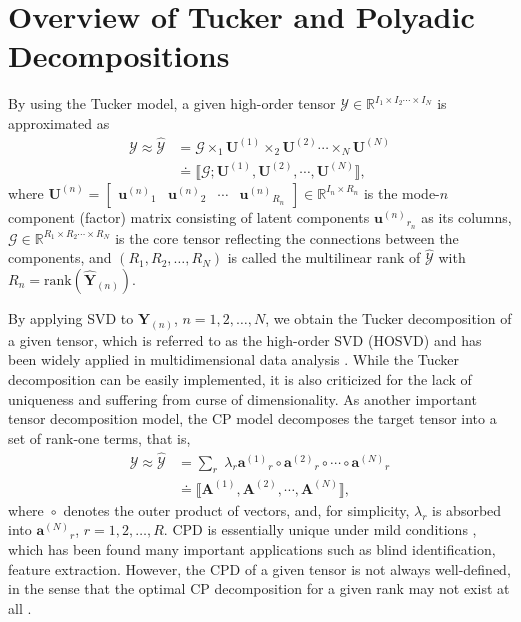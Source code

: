 \documentclass[10pt,twocolumn,twoside]{IEEEtran}
\newcommand{\tensor}[1]{\ensuremath{\boldsymbol{\mathscr{#1}}}}
\newcommand{\tenmat}[2][n]{\ensuremath{{\mathbf{#2}}_{(#1)}}}
\newcommand{\matn}[2][n]{\ensuremath{\mathbf{#2}^{(#1)}}}
\newcommand{\compactTucker}[2]{\ensuremath{\llbracket \tensor{#1}; {\mathbf{#2}}^{(1)}, {\mathbf{#2}}^{(2)}, \cdots, {\mathbf{#2}}^{(N)}\rrbracket}}
\newcommand{\compactcp}[1]{\ensuremath{\llbracket {\mathbf{#1}}^{(1)}, {\mathbf{#1}}^{(2)}, \cdots, {\mathbf{#1}}^{(N)}\rrbracket}}
\newcommand{\ttmn}[2][n]{\ensuremath{\times_{#1}\matn[#1]{{#2}}}}
\newcommand{\Real}{\ensuremath{\mathbb{R}}}
\newcommand{\rank}[1]{\ensuremath{\text{rank}(#1)}}
\newcommand{\defeq}{\ensuremath{\doteq}}
\DeclareMathOperator*{\outerp}{{\circ}}         \newcommand{\innerprod}[2]{\ensuremath{\langle{#1},{#2}\rangle}}
\begin{document}
\section{Overview of Tucker and Polyadic Decompositions}
\label{sec:Models}
By using the Tucker model, a given high-order tensor $\tensor{Y}\in\Real^{I_1\times I_2\cdots\times I_N}$ is approximated as
\begin{equation}
\label{eq:Tucker}
\begin{split}
\tensor{Y}\approx\tensor{\hat{Y}}&=\tensor{G}\ttmn[1]{U}\ttmn[2]{U}\cdots\ttmn[N]{U}\\
&\defeq\compactTucker{G}{U}, 
\end{split}
\end{equation}
where $\matn{U}=\begin{bmatrix}
\matn{u}_1 & \matn{u}_2 & \cdots & \matn{u}_{R_n}
\end{bmatrix}\in\Real^{I_n\times R_n}$ is the mode-$n$ component (factor) matrix consisting of latent components $\matn{u}_{r_n}$ as its columns,  $\tensor{G}\in\Real^{R_1\times R_2\cdots\times R_N}$ is the core tensor reflecting the connections between the components, and  $(R_1,R_2,\ldots,R_N)$ is called the multilinear rank of \tensor{\hat{Y}} with $R_n=\rank{\tenmat{\hat{Y}}}$. 

By applying SVD to \tenmat{Y}, $n=1,2,\ldots,N$, we obtain the Tucker decomposition of a given tensor, which is referred to as the high-order SVD (HOSVD) and has been widely applied in multidimensional data analysis \cite{tensorFaces,HOgraphMatch,DenoisingHOSVD2013}. While the Tucker decomposition can be easily implemented, it is also criticized for the lack of uniqueness and suffering from curse of dimensionality. As another important tensor decomposition model, the CP model decomposes the target tensor into a set of rank-one terms, that is,
\begin{equation}
\label{eq:Polyadic}
\begin{split}
\tensor{Y}\approx\tensor{\hat{Y}} &=\sum_r \;\lambda_r\matn[1]{a}_r\outerp\matn[2]{a}_r\outerp\cdots\outerp\matn[N]{a}_r \\
&\defeq\compactcp{A},
\end{split}
\end{equation}
where $\outerp$ denotes the outer product of vectors, 
and, for simplicity, $\lambda_r$ is absorbed into $\matn[N]{a}_r$, $r=1,2,\ldots,R$.
CPD is essentially unique under mild conditions \cite{Sidiropoulos2000}, which has been found many important applications such as blind identification, feature extraction. However, the CPD of a given tensor is not always well-defined, in the sense that the optimal CP decomposition for a given rank may not exist at all \cite{deSilva:2008:ill-posted}.
\end{document}
